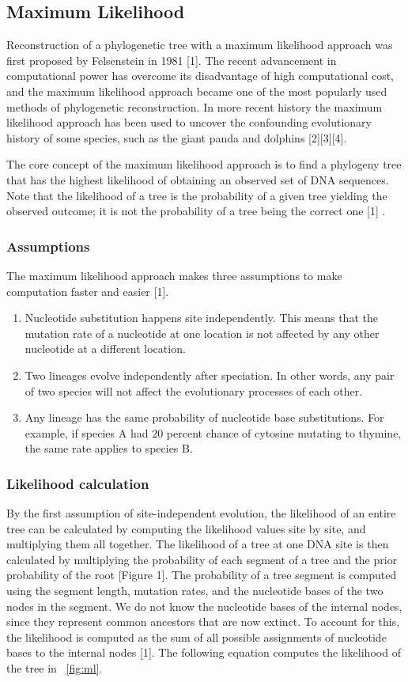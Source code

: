 \documentclass[10pt,twocolumn]{article}
\begin{document}
\subsection*{Maximum Likelihood}

Reconstruction of a phylogenetic tree with a maximum likelihood approach was first proposed by Felsenstein in 1981 [1]. The recent advancement in computational power has overcome its disadvantage of high computational cost, and the maximum likelihood approach became one of the most popularly used methods of phylogenetic reconstruction. In more recent history the maximum likelihood approach has been used to uncover the confounding evolutionary history of some species, such as the giant panda and dolphins [2][3][4]. 

The core concept of the maximum likelihood approach is to find a phylogeny tree that has the highest likelihood of obtaining an observed set of DNA sequences. Note that the likelihood of a tree is the probability of a given tree yielding the observed outcome; it is not the probability of a tree being the correct one [1] .
 
\subsubsection*{Assumptions}
The maximum likelihood approach makes three assumptions to make computation faster and easier [1].
\begin{enumerate}
  \item Nucleotide substitution happens site independently. This means that the mutation rate of a nucleotide at one location is not affected by any other nucleotide at a different location. 
  \item Two lineages evolve independently after speciation. In other words, any pair of two species will not affect the evolutionary processes of each other.
  \item Any lineage has the same probability of nucleotide base substitutions. For example, if species A had 20 percent chance of cytosine mutating to thymine, the same rate applies to species B.
\end{enumerate}

\subsubsection*{Likelihood calculation}
By the first assumption of site-independent evolution, the likelihood of an entire tree can be calculated by computing the likelihood values site by site, and multiplying them all together. The likelihood of a tree at one DNA site is then calculated by multiplying the probability of each segment of a tree and the prior probability of the root [Figure 1]. The probability of a tree segment is computed using the segment length, mutation rates, and the nucleotide bases of the two nodes in the segment. We do not know the nucleotide bases of the internal nodes, since they represent common ancestors that are now extinct. To account for this, the likelihood is computed as the sum of all possible assignments of nucleotide bases to the internal nodes [1]. The following equation computes the likelihood of the tree in ~\ref{fig:ml}.
\end{document}
